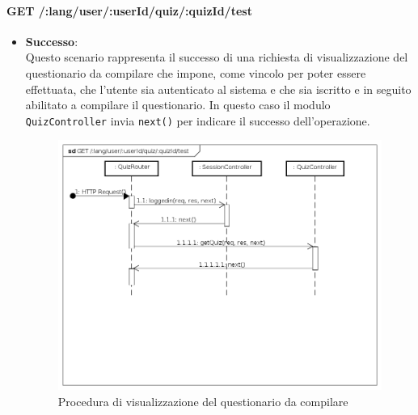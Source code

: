 \paragraph{GET /:lang/user/:userId/quiz/:quizId/test} %
\begin{itemize}
\item \textbf{Successo}:\\
Questo scenario rappresenta il successo di una richiesta di visualizzazione del questionario da compilare che impone, come vincolo per poter essere effettuata, che l'utente sia autenticato al sistema e che sia iscritto e in seguito abilitato a compilare il questionario. In questo caso il modulo \texttt{QuizController} invia \texttt{next()} per indicare il successo dell'operazione.
\label{Procedura di visualizzazione del questionario da compilare}
\begin{figure}[ht]
	\centering
	\includegraphics[scale=0.40]{UML/DiagrammiDiSequenza/Back-end/GET__lang_user_userId_quiz_quizId_test_success.png}
	\caption{Procedura di visualizzazione del questionario da compilare}
\end{figure}
\FloatBarrier


\end{itemize}
